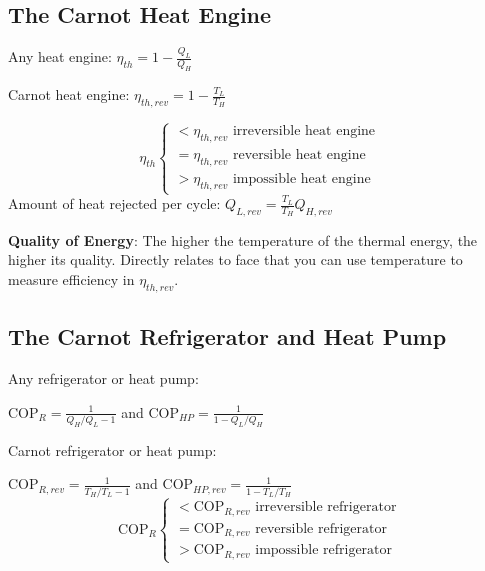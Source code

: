 \documentclass{article}
\begin{document}
\begin{multicols}{3}
    \subsection*{The Carnot Heat Engine}
    Any heat engine: $\eta_{th}=1-\frac{Q_L}{Q_H}$\par 
    Carnot heat engine: $\eta_{th,rev}=1-\frac{T_L}{T_H}$\par 
    \begin{equation*}
        \eta_{th}\left\{
            \begin{array}{l}
                <\eta_{th,rev}\text{ irreversible heat engine}\\
                =\eta_{th,rev}\text{ reversible heat engine}\\
                >\eta_{th,rev}\text{ impossible heat engine}
            \end{array}
        \right.
    \end{equation*}
    Amount of heat rejected per cycle: $Q_{L,rev}=\frac{T_L}{T_H}Q_{H,rev}$\par 
    \textbf{Quality of Energy}: The higher the temperature of the thermal energy, the higher its quality. Directly relates to face that you can use temperature to measure efficiency in $\eta_{th,rev}$.
    \subsection*{The Carnot Refrigerator and Heat Pump}
    Any refrigerator or heat pump:\par 
    $\text{COP}_R=\frac{1}{Q_H/Q_L-1}$ and $\text{COP}_{HP}=\frac{1}{1-Q_L/Q_H}$\par 
    Carnot refrigerator or heat pump:\par 
    $\text{COP}_{R,rev}=\frac{1}{T_H/T_L-1}$ and $\text{COP}_{HP,rev}=\frac{1}{1-T_L/T_H}$
    \begin{equation*}
        \text{COP}_{R}\left\{
            \begin{array}{l}
                <\text{COP}_{R,rev}\text{ irreversible refrigerator}\\
                =\text{COP}_{R,rev}\text{ reversible refrigerator}\\
                >\text{COP}_{R,rev}\text{ impossible refrigerator}
            \end{array}
        \right.
    \end{equation*}
    
    \newpage

\end{multicols}
\end{document}
